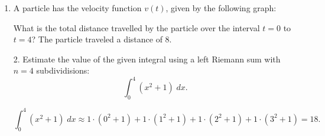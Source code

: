 \documentclass[11pt]{article}
\begin{document}
\pagestyle{empty}
\newsavebox{\quizfront}
\begin{lrbox}{\quizfront}
\begin{minipage}[top][4.5in][t]{\textwidth} \setlength{\parindent}{1.5em}
\drawtitle
\vspace{-0.5in}
\begin{enumerate}

\item A particle has the velocity function $v(t)$, given by the following graph:

\begin{center}
\end{center}
\vspace{-.1in}
What is the total distance travelled by the particle over the interval $t=0$ to $t=4$? 
\vfill
{\color{blue} The particle traveled a distance of 8.}

\end{enumerate}

\vfill



\end{minipage}
\end{lrbox}

\newsavebox{\quizback}
\begin{lrbox}{\quizback}
\begin{minipage}[top][4.5in][t]{\textwidth} \setlength{\parindent}{1.5em}
\begin{enumerate}
\item[2.] Estimate the value of the given integral using a left
  Riemann sum with $n=4$ subdividisions:
  \[
  \int_0^4 \left( x^2 + 1 \right) \; dx.
  \]
  \vfill
  {\color{blue}

  \[
  \int_0^4 \left( x^2 + 1 \right) \; dx \approx 1\cdot (0^2 + 1) + 1\cdot (1^2 + 1) +
  1\cdot (2^2 + 1) + 1\cdot (3^2 + 1) = 18.
  \]

}
\vfill
\end{enumerate}
\end{minipage}
\end{lrbox}

\noindent \usebox{\quizfront}
\vfill
\noindent \usebox{\quizback}

\end{document}

